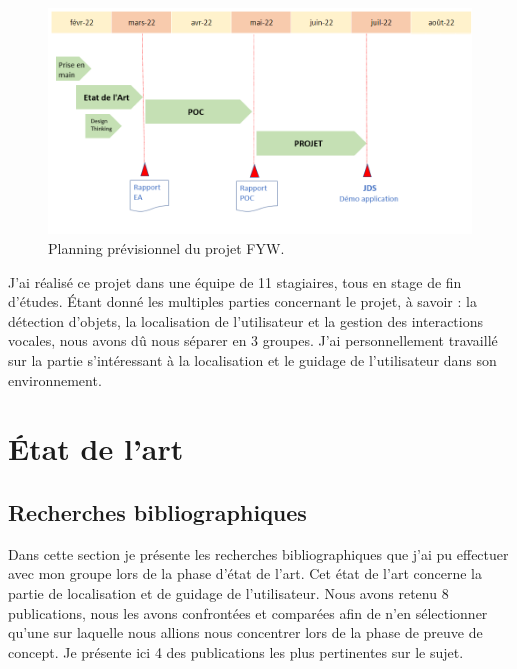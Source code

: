 \documentclass[11pt]{article}
\begin{document}
    \begin{figure}[hbt]  
      \includegraphics[width=\textwidth]{Planning.png}    
      \caption{Planning prévisionnel du projet FYW.}
      \label{fig:Planning}
    \end{figure}  
    
    J'ai réalisé ce projet dans une équipe de 11 stagiaires, tous en stage de fin d'études. Étant donné les multiples parties concernant le projet, 
    à savoir : la détection d'objets, la localisation de l'utilisateur et la gestion des interactions vocales, nous avons dû nous séparer en 3 
    groupes. J'ai personnellement travaillé sur la partie s'intéressant à la localisation et le guidage de l'utilisateur dans son environnement. 
    
    \pagebreak
  
  \section{État de l'art}  

    \subsection{Recherches bibliographiques}
      Dans cette section je présente les recherches bibliographiques que j'ai pu effectuer avec mon groupe lors de la phase d'état de l'art.
      Cet état de l'art concerne la partie de localisation et de guidage de l'utilisateur. Nous avons retenu 8 publications, nous les avons 
      confrontées et comparées afin de n'en sélectionner qu'une sur laquelle nous allions nous concentrer lors de la phase de preuve de 
      concept. Je présente ici 4 des publications les plus pertinentes sur le sujet.
      
\end{document}
